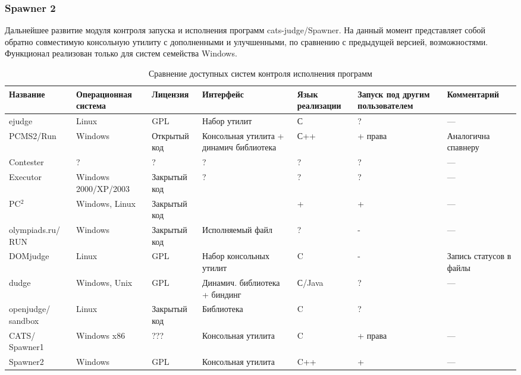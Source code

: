 \documentclass{imcs}
\begin{document}
\subsubsection{Spawner 2}
Дальнейшее развитие модуля контроля запуска и исполнения программ cats-judge/Spawner\cite{spawner_src}.
На данный момент представляет собой обратно совместимую консольную утилиту с дополненными и улучшенными, по сравнению с предыдущей версией, возможностями.
Функционал реализован только для систем семейства Windows.

\begin{landscape}
\begin{table}[h!]
\begin{center}
\begin{tabularx}{25cm}{|X|X|X|X|X|X|X|}
\hline
  Название   &  Операционная система  &  Лицензия  &  Интерфейс  &  Язык	реализации 		&  Запуск под другим	пользователем  & Комментарий \\
\hline
ejudge  &  Linux          &  GPL        &    Набор утилит         &  С          &  ?   &   ---    \\%
\hline
PCMS2/Run &  Windows  & Открытый код        &     Консольная утилита + динамич библиотека  &  С++          &  + права  &   Аналогична спавнеру    \\
\hline
Contester &  ?          &  ?        &   ?          &  ?          &  ?   &   ---    \\
\hline
Executor &  Windows 2000/XP/2003          &  Закрытый код        &   ?          &  ?          &  ?   &   ---    \\
\hline
PC$^2$ &  Windows, Linux          &  Закрытый код        &             &  +          &  +   &   ---  \\
\hline
olympiads.ru/ RUN &  Windows          &  Закрытый код        &   Исполняемый файл          &  ?          &  -   &   ---    \\
\hline
DOMjudge &     Linux      &  GPL\cite{gpl}       &      Набор консольных утилит       &  C          &  -   &   Запись статусов в файлы    \\
\hline
dudge &  Windows, Unix          &  GPL        &     Динамич. библиотека + биндинг        &  С/Java          &  ?   &   ---    \\
\hline
openjudge/ sandbox &  Linux          &  Закрытый код        &    Библиотека         &  C          &  ?   &       \\
\hline
CATS/ Spawner1 &  Windows x86          &  ???        &    Консольная утилита         &  C          &  + права  &   ---    \\
\hline
Spawner2 &  Windows          &  GPL        &     Консольная утилита        &  C++          &  +   &   ---    \\
\hline
\end{tabularx}
\caption{Сравнение доступных систем контроля исполнения программ}\label{tab:wsi_diff_rel}
\end{center}
\end{table}
\end{landscape}
\end{document}
